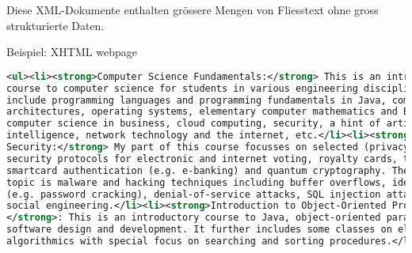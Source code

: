 Diese XML-Dokumente enthalten grössere Mengen von Fliesstext ohne gross strukturierte Daten.

Beispiel: XHTML webpage

\begin{lstlisting}[language=XML]
<ul><li><strong>Computer Science Fundamentals:</strong> This is an introductory
course to computer science for students in various engineering disciplines. Topics
include programming languages and programming fundamentals in Java, computer
architectures, operating systems, elementary computer mathematics and Boolean logic,
computer science in business, cloud computing, security, a hint of artificial
intelligence, network technology and the internet, etc.</li><li><strong>Information
Security:</strong> My part of this course focusses on selected (privacy-preserving)
security protocols for electronic and internet voting, royalty cards, toll pricing,
smartcard authentication (e.g. e-banking) and quantum cryptography. The second main
topic is malware and hacking techniques including buffer overflows, identity theft
(e.g. password cracking), denial-of-service attacks, SQL injection attacks, XSS and
social engineering.</li><li><strong>Introduction to Object-Oriented Programming
</strong>: This is an introductory course to Java, object-oriented paradigms and
software design and development. It further includes some classes on elementary
algorithmics with special focus on searching and sorting procedures.</li></ul>
\end{lstlisting}